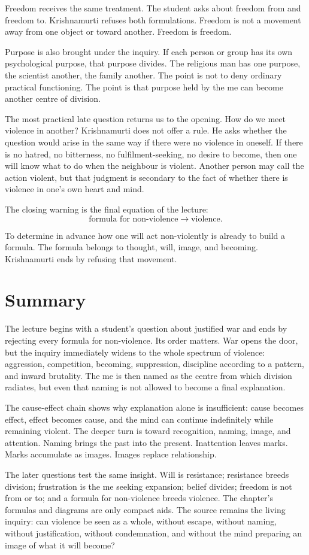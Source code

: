 Freedom receives the same treatment. The student asks about freedom from and freedom to. Krishnamurti refuses both formulations. Freedom is not a movement away from one object or toward another. Freedom is freedom.

Purpose is also brought under the inquiry. If each person or group has its own psychological purpose, that purpose divides. The religious man has one purpose, the scientist another, the family another. The point is not to deny ordinary practical functioning. The point is that purpose held by the me can become another centre of division.

The most practical late question returns us to the opening. How do we meet violence in another? Krishnamurti does not offer a rule. He asks whether the question would arise in the same way if there were no violence in oneself. If there is no hatred, no bitterness, no fulfilment-seeking, no desire to become, then one will know what to do when the neighbour is violent. Another person may call the action violent, but that judgment is secondary to the fact of whether there is violence in one's own heart and mind.

The closing warning is the final equation of the lecture:
\begin{equation}
\text{formula for non-violence}
\rightarrow
\text{violence}.
\end{equation}

To determine in advance how one will act non-violently is already to build a formula. The formula belongs to thought, will, image, and becoming. Krishnamurti ends by refusing that movement.

\section{Summary}

The lecture begins with a student's question about justified war and ends by rejecting every formula for non-violence. Its order matters. War opens the door, but the inquiry immediately widens to the whole spectrum of violence: aggression, competition, becoming, suppression, discipline according to a pattern, and inward brutality. The me is then named as the centre from which division radiates, but even that naming is not allowed to become a final explanation.

The cause-effect chain shows why explanation alone is insufficient: cause becomes effect, effect becomes cause, and the mind can continue indefinitely while remaining violent. The deeper turn is toward recognition, naming, image, and attention. Naming brings the past into the present. Inattention leaves marks. Marks accumulate as images. Images replace relationship.

The later questions test the same insight. Will is resistance; resistance breeds division; frustration is the me seeking expansion; belief divides; freedom is not from or to; and a formula for non-violence breeds violence. The chapter's formulas and diagrams are only compact aids. The source remains the living inquiry: can violence be seen as a whole, without escape, without naming, without justification, without condemnation, and without the mind preparing an image of what it will become?